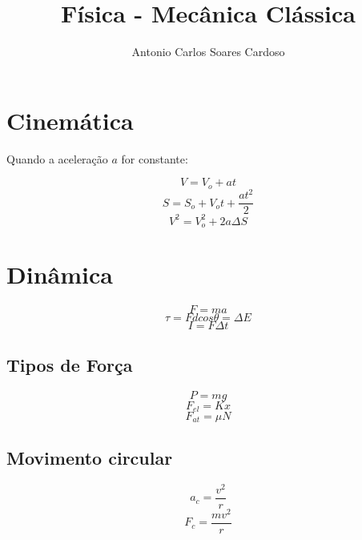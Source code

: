 \documentclass[
    12pt, %
    openright,
    twoside, %
    a4paper, %
    article,
    english,brazil %
]{abntex2}
\author{Antonio Carlos Soares Cardoso}
\title{Física - Mecânica Clássica}
\makeatletter
\renewcommand\tableofcontents{%
  \null\hfill\textbf{\Large\contentsname}\hfill\null\par
  \@mkboth{\MakeUppercase\contentsname}{\MakeUppercase\contentsname}%
  \@starttoc{toc}%
}
\makeatother
\begin{document}
\tableofcontents

\newpage

\textual

\section{Cinemática}

Quando a aceleração $a$ for constante: 

$$V = V_o + at$$ 
$$S = S_o + V_ot + \frac{at^2}{2}$$
$$V^2 = V_o^2 + 2a\Delta S$$

\section{Dinâmica}

$$F = ma$$
$$\tau = Fdcos\theta = \Delta E$$
$$I = F\Delta t$$

\subsection{Tipos de Força} 

$$P = mg$$
$$F_{el} = Kx$$
$$F_{at} = \mu N$$

\subsection{Movimento circular}

$$a_c = \frac{v^2}{r}$$
$$F_c = \frac{mv^2}{r}$$
\end{document}
